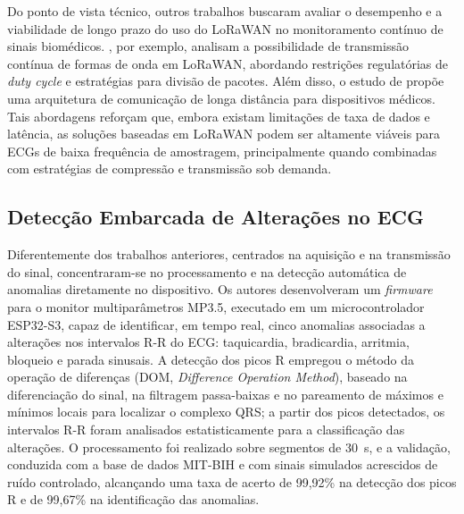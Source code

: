 Do ponto de vista técnico, outros trabalhos buscaram avaliar o desempenho e a viabilidade de longo prazo do uso do LoRaWAN no monitoramento contínuo de sinais biomédicos. \cite{lorawanWaveform}, por exemplo, analisam a possibilidade de transmissão contínua de formas de onda em LoRaWAN, abordando restrições regulatórias de \textit{duty cycle} e estratégias para divisão de pacotes. Além disso, o estudo de \cite{lorawanLongDistance} propõe uma arquitetura de comunicação de longa distância para dispositivos médicos. Tais abordagens reforçam que, embora existam limitações de taxa de dados e latência, as soluções baseadas em LoRaWAN podem ser altamente viáveis para ECGs de baixa frequência de amostragem, principalmente quando combinadas com estratégias de compressão e transmissão sob demanda.

\subsection{Detecção Embarcada de Alterações no ECG}
\label{sec:deteccaoEmbarcada}

Diferentemente dos trabalhos anteriores, centrados na aquisição e na transmissão do sinal,  concentraram-se no processamento e na detecção automática de anomalias diretamente no dispositivo. Os autores desenvolveram um \textit{firmware} para o monitor multiparâmetros MP3.5, executado em um microcontrolador ESP32-S3, capaz de identificar, em tempo real, cinco anomalias associadas a alterações nos intervalos R-R do \acs{ECG}: taquicardia, bradicardia, arritmia, bloqueio e parada sinusais. A detecção dos picos R empregou o método da operação de diferenças (DOM, \textit{Difference Operation Method}), baseado na diferenciação do sinal, na filtragem passa-baixas e no pareamento de máximos e mínimos locais para localizar o complexo QRS; a partir dos picos detectados, os intervalos R-R foram analisados estatisticamente para a classificação das alterações. O processamento foi realizado sobre segmentos de 30~s, e a validação, conduzida com a base de dados MIT-BIH e com sinais simulados acrescidos de ruído controlado, alcançando uma taxa de acerto de 99,92\% na detecção dos picos R e de 99,67\% na identificação das anomalias.

